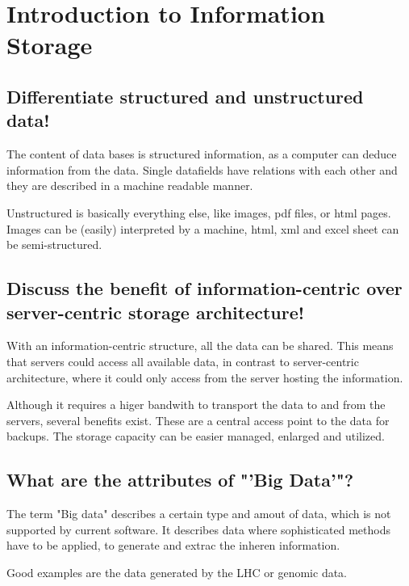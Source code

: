 \section{Introduction to Information Storage} %
\label{sec:introduction_to_information_storage}

\subsection{Differentiate structured and unstructured data!} %
\label{sub:differentiate_structured_and_unstructured_data}
	The content of data bases is structured information,
	as a computer can deduce information from the data.
	Single datafields have relations with each other
	and they are described in a machine readable manner.

	Unstructured is basically everything else,
	like images, pdf files, or html pages.
	Images can be (easily) interpreted by a machine,
	html, xml and excel sheet can be semi-structured.

\subsection{Discuss the benefit of information-centric over server-centric storage architecture!} %
\label{sub:discuss_the_benefit_of_information_centric_over_server_centric_storage_architecture}
	With an information-centric structure,
	all the data can be shared.
	This means that servers could access all available data,
	in contrast to server-centric architecture,
	where it could only access from the server hosting the information.

	Although it requires a higer bandwith to transport the data to and from the servers,
	several benefits exist.
	These are a central access point to the data for backups.
	The storage capacity can be easier managed, enlarged and utilized.

\subsection{What are the attributes of "'Big Data'"?} %
\label{sub:what_are_the_attributes_of_big_data}
	The term "Big data" describes a certain type and amout of data,
	which is not supported by current software.
	It describes data where sophisticated methods have to be applied,
	to generate and extrac the inheren information.

	Good examples are the data generated by the LHC or genomic data.


